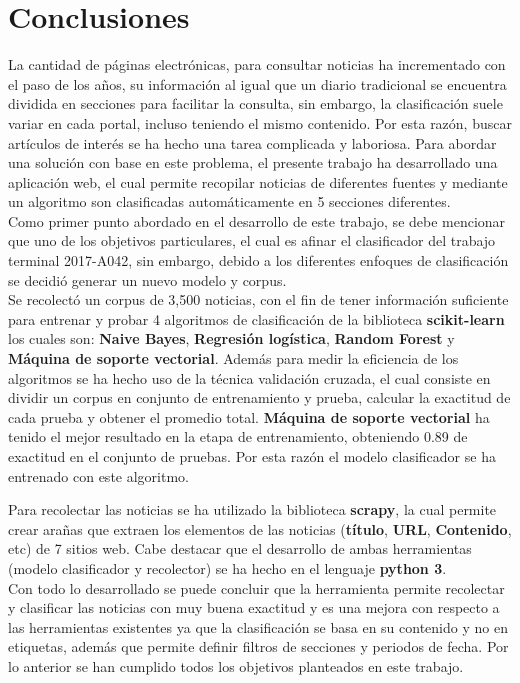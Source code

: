\section{Conclusiones}

La cantidad de páginas electrónicas, para consultar noticias ha incrementado con el paso de los años, su información al igual que un diario tradicional se encuentra dividida en secciones para facilitar 
la consulta, sin embargo, la clasificación suele variar en cada portal, incluso teniendo el mismo contenido. Por esta razón, buscar artículos de interés se ha hecho una tarea complicada y laboriosa. Para abordar una solución con base en este problema, el presente trabajo ha desarrollado
una aplicación web, el cual permite recopilar noticias de diferentes fuentes y mediante un algoritmo son clasificadas automáticamente en 5 secciones diferentes.\\

Como primer punto abordado en el desarrollo de este trabajo, se debe mencionar que uno de los objetivos particulares, el cual es afinar el clasificador del trabajo terminal 2017-A042, sin embargo, debido a los diferentes enfoques de clasificación se decidió generar un nuevo modelo y corpus.\\ 

Se recolectó un corpus de 3,500 noticias, con el fin de tener información suficiente para entrenar y probar 4 algoritmos de clasificación de la biblioteca \textbf{scikit-learn} los cuales son: \textbf{Naive Bayes}, \textbf{Regresión logística}, \textbf{Random Forest} y \textbf{Máquina de soporte vectorial}. Además para medir la eficiencia de los algoritmos se ha hecho uso de la técnica validación cruzada, el cual consiste en dividir un corpus en conjunto de entrenamiento y prueba, calcular la exactitud de cada prueba y obtener el promedio total. \textbf{Máquina de soporte vectorial} ha tenido el mejor resultado en la etapa de entrenamiento, obteniendo 0.89 de exactitud en el conjunto de pruebas. Por esta razón el modelo clasificador se ha entrenado con este algoritmo. 

Para recolectar las noticias se ha utilizado la biblioteca \textbf{scrapy}, la cual permite crear arañas que extraen los elementos de las noticias (\textbf{título}, \textbf{URL}, \textbf{Contenido}, etc) de 7 sitios web. Cabe destacar que el desarrollo de ambas herramientas (modelo clasificador y recolector) se ha hecho en el lenguaje \textbf{python 3}.\\


Con todo lo desarrollado se puede concluir que la herramienta permite recolectar y clasificar las noticias con muy buena exactitud y es una mejora con respecto a las herramientas existentes ya que la clasificación se basa en su contenido y no en etiquetas, además que permite definir filtros de secciones y periodos de fecha. Por lo anterior se han cumplido todos los objetivos planteados en este trabajo.


